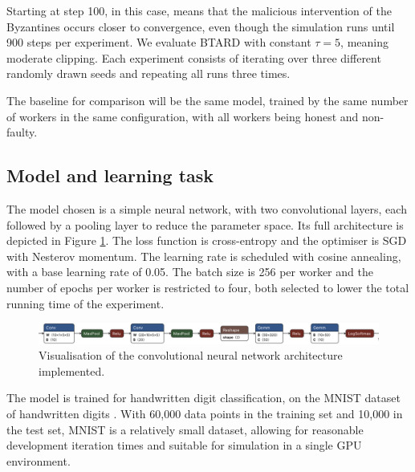 \documentclass{article}
\begin{document}
Starting at step 100, in this case, means that the malicious intervention of the Byzantines occurs closer to convergence, even though the simulation runs until 900 steps per experiment. We evaluate BTARD with constant $\tau = 5$, meaning moderate clipping. Each experiment consists of iterating over three different randomly drawn seeds and repeating all runs three times. 

The baseline for comparison will be the same model, trained by the same number of workers in the same configuration, with all workers being honest and non-faulty.

\subsection{Model and learning task}
The model chosen is a simple neural network, with two convolutional layers, each followed by a pooling layer to reduce the parameter space. Its full architecture is depicted in Figure \ref{fig:model}. The loss function is cross-entropy and the optimiser is SGD with Nesterov momentum. The learning rate is scheduled with cosine annealing, with a base learning rate of 0.05. The batch size is 256 per worker and the number of epochs per worker is restricted to four, both selected to lower the total running time of the experiment.

\begin{figure}[h]
\centering
\includegraphics[width=\textwidth]{figs/cnn-shorter.png}
\caption{Visualisation of the convolutional neural network architecture implemented.}
\label{fig:model}
\end{figure}

The model is trained for handwritten digit classification, on the MNIST dataset of handwritten digits \citep{lecun1998gradient, mnist_database}. With 60,000 data points in the training set and 10,000 in the test set, MNIST is a relatively small dataset, allowing for reasonable development iteration times and suitable for simulation in a single GPU environment. %
\end{document}
